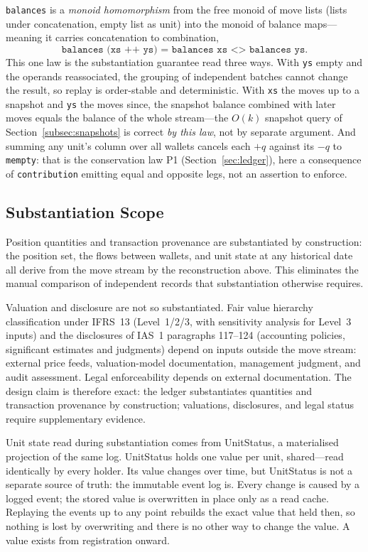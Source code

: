 \begin{remark}
\lstinline!balances! is a \emph{monoid homomorphism} from the free monoid of move lists (lists under concatenation, empty list as unit) into the monoid of balance maps---meaning it carries concatenation to combination,
\[
\texttt{balances (xs ++ ys) = balances xs <> balances ys}.
\]
This one law is the substantiation guarantee read three ways. With \texttt{ys} empty and the operands reassociated, the grouping of independent batches cannot change the result, so replay is order-stable and deterministic. With \texttt{xs} the moves up to a snapshot and \texttt{ys} the moves since, the snapshot balance combined with later moves equals the balance of the whole stream---the $O(k)$ snapshot query of Section~\ref{subsec:snapshots} is correct \emph{by this law}, not by separate argument. And summing any unit's column over all wallets cancels each $+q$ against its $-q$ to \texttt{mempty}: that is the conservation law P1 (Section~\ref{sec:ledger}), here a consequence of \lstinline!contribution! emitting equal and opposite legs, not an assertion to enforce.
\end{remark}

\subsection{Substantiation Scope}

Position quantities and transaction provenance are substantiated by construction: the position set, the flows between wallets, and unit state at any historical date all derive from the move stream by the reconstruction above. This eliminates the manual comparison of independent records that substantiation otherwise requires.

Valuation and disclosure are not so substantiated. Fair value hierarchy classification under IFRS~13 (Level~1/2/3, with sensitivity analysis for Level~3 inputs) and the disclosures of IAS~1 paragraphs 117--124 (accounting policies, significant estimates and judgments) depend on inputs outside the move stream: external price feeds, valuation-model documentation, management judgment, and audit assessment. Legal enforceability depends on external documentation. The design claim is therefore exact: the ledger substantiates quantities and transaction provenance by construction; valuations, disclosures, and legal status require supplementary evidence.

Unit state read during substantiation comes from UnitStatus, a materialised projection of the same log. UnitStatus holds one value per unit, shared---read identically by every holder. Its value changes over time, but UnitStatus is not a separate source of truth: the immutable event log is. Every change is caused by a logged event; the stored value is overwritten in place only as a read cache. Replaying the events up to any point rebuilds the exact value that held then, so nothing is lost by overwriting and there is no other way to change the value. A value exists from registration onward.

